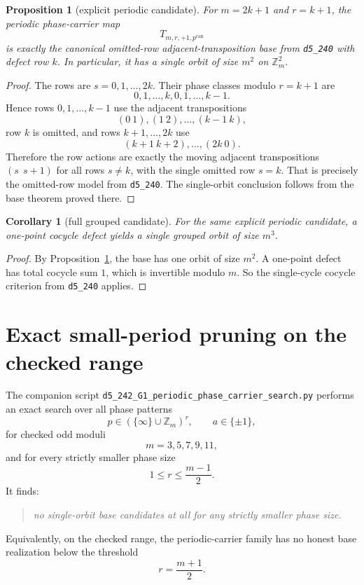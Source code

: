 \documentclass[11pt]{article}
\newtheorem{proposition}[theorem]{Proposition}
\newtheorem{corollary}[theorem]{Corollary}
\begin{document}
\begin{proposition}[explicit periodic candidate]
\label{prop:explicit-periodic-candidate}
For $m=2k+1$ and $r=k+1$, the periodic phase-carrier map
\[
T_{m,r,+1,p^{\mathrm{can}}}
\]
is exactly the canonical omitted-row adjacent-transposition base from
\texttt{d5\_240} with defect row $k$.
In particular, it has a single orbit of size $m^2$ on $\mathbb Z_m^2$.
\end{proposition}

\begin{proof}
The rows are $s=0,1,\dots,2k$.
Their phase classes modulo $r=k+1$ are
\[
0,1,\dots,k,0,1,\dots,k-1.
\]
Hence rows $0,1,\dots,k-1$ use the adjacent transpositions
\[
(0\ 1),(1\ 2),\dots,(k-1\ k),
\]
row $k$ is omitted, and rows $k+1,\dots,2k$ use
\[
(k+1\ k+2),\dots,(2k\ 0).
\]
Therefore the row actions are exactly the moving adjacent transpositions
$(s\ \ s+1)$ for all rows $s\neq k$, with the single omitted row $s=k$.
That is precisely the omitted-row model from \texttt{d5\_240}.
The single-orbit conclusion follows from the base theorem proved there.
\end{proof}

\begin{corollary}[full grouped candidate]
\label{cor:grouped-candidate}
For the same explicit periodic candidate, a one-point cocycle defect yields a
single grouped orbit of size $m^3$.
\end{corollary}

\begin{proof}
By Proposition~\ref{prop:explicit-periodic-candidate}, the base has one orbit of
size $m^2$.
A one-point defect has total cocycle sum $1$, which is invertible modulo $m$.
So the single-cycle cocycle criterion from \texttt{d5\_240} applies.
\end{proof}

\section{Exact small-period pruning on the checked range}
The companion script
\texttt{d5\_242\_G1\_periodic\_phase\_carrier\_search.py}
performs an exact search over all phase patterns
\[
 p\in (\{\infty\}\cup\mathbb Z_m)^r,
 \qquad a\in\{\pm1\},
\]
for checked odd moduli
\[
 m=3,5,7,9,11,
\]
and for every strictly smaller phase size
\[
 1\le r\le \frac{m-1}{2}.
\]
It finds:
\begin{quote}
\emph{no single-orbit base candidates at all for any strictly smaller phase
size.}
\end{quote}
Equivalently, on the checked range, the periodic-carrier family has no honest
base realization below the threshold
\[
 r=\frac{m+1}{2}.
\]
\end{document}
